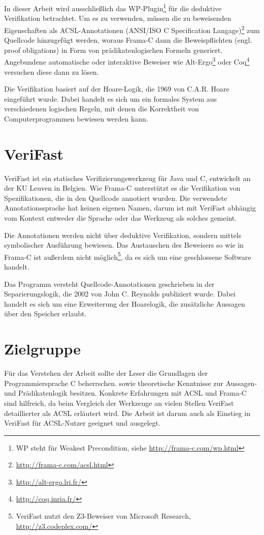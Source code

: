 In dieser Arbeit wird ausschließlich das WP-Plugin\footnote{WP steht für Weakest Precondition, siehe
\url{http://frama-c.com/wp.html}} für die deduktive Verifikation betrachtet. Um es zu verwenden, müssen die zu beweisenden 
Eigenschaften als ACSL-Annotationen (ANSI/ISO C Specification Langage)\footnote{\url{http://frama-c.com/acsl.html}} zum Quellcode hinzugefügt werden, woraus Frama-C dann die 
Beweispflichten (engl. proof obligations) in Form von prädikatenlogischen Formeln generiert. Angebundene automatische oder 
interaktive Beweiser wie Alt-Ergo\footnote{\url{http://alt-ergo.lri.fr/}} oder Coq\footnote{\url{http://coq.inria.fr/}}
versuchen diese dann zu lösen.

Die Verifikation basiert auf der Hoare-Logik, die 1969 von C.A.R. Hoare eingeführt wurde\cite{hoare}. Dabei
handelt es sich um ein formales System aus verschiedenen logischen Regeln, mit denen die Korrektheit von
Computerprogrammen bewiesen werden kann.


\section{VeriFast}
\label{sec:VeriFast}

VeriFast ist ein statisches Verifizierungswerkzeug für Java und C, entwickelt an der KU Leuven in Belgien.
Wie Frama-C unterstützt es die Verifikation von Spezifikationen, die in den Quellcode annotiert wurden. Die verwendete
Annotationssprache hat keinen eigenen Namen, darum ist mit \glqq VeriFast\grqq{} abhängig vom Kontext entweder die Sprache oder das
Werkzeug als solches gemeint.

Die Annotationen werden nicht über deduktive Verifikation, sondern mittels symbolischer Ausführung bewiesen. Das Austauschen
des Beweisers so wie in Frama-C ist außerdem nicht möglich\footnote{VeriFast nutzt den Z3-Beweiser von Microsoft Research,
\url{http://z3.codeplex.com/}}, da es sich um eine geschlossene Software handelt.

Das Programm versteht Quellcode-Annotationen geschrieben in der Separierungslogik, die 2002 von John C. Reynolds publiziert
wurde\cite{reynolds-2002}. Dabei handelt es sich um eine Erweiterung der Hoarelogik, die zusätzliche Aussagen über den Speicher
erlaubt.


\section{Zielgruppe}
\label{sec:zielgruppe}

Für das Verstehen der Arbeit sollte der Leser die Grundlagen der Programmiersprache C beherrschen.
sowie theoretische Kenntnisse zur Aussagen- und Prädikatenlogik besitzen.
Konkrete Erfahrungen mit ACSL und Frama-C sind hilfreich, da beim Vergleich der Werkzeuge an vielen
Stellen VeriFast detaillierter als ACSL erläutert wird. Die Arbeit ist darum auch als Einstieg in VeriFast
für ACSL-Nutzer geeignet und ausgelegt.

 

